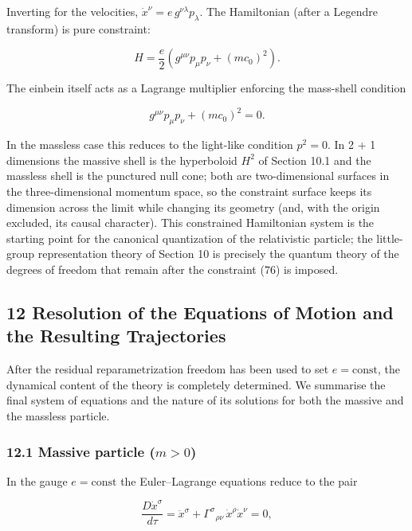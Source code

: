 \documentclass[
]{article}
\begin{document}
Inverting for the velocities,
\(\dot{x}^{\nu} = e\, g^{\nu\lambda} p_{\lambda}\). The Hamiltonian
(after a Legendre transform) is pure constraint:

\[H = \frac{e}{2} \left( g^{\mu\nu} p_{\mu} p_{\nu} + (mc_{0})^{2} \right). \tag{75}\]

The einbein itself acts as a Lagrange multiplier enforcing the
mass-shell condition

\[g^{\mu\nu} p_{\mu} p_{\nu} + (mc_{0})^{2} = 0. \tag{76}\]

In the massless case this reduces to the light-like condition
\(p^{2} = 0\). In 2 + 1 dimensions the massive shell is the hyperboloid
\(H^{2}\) of Section 10.1 and the massless shell is the punctured null
cone; both are two-dimensional surfaces in the three-dimensional
momentum space, so the constraint surface keeps its dimension across the
limit while changing its geometry (and, with the origin excluded, its
causal character). This constrained Hamiltonian system is the starting
point for the canonical quantization of the relativistic particle; the
little-group representation theory of Section 10 is precisely the
quantum theory of the degrees of freedom that remain after the
constraint (76) is imposed.

\hypertarget{resolution-of-the-equations-of-motion-and-the-resulting-trajectories}{%
\subsection{12 Resolution of the Equations of Motion and the Resulting
Trajectories}\label{resolution-of-the-equations-of-motion-and-the-resulting-trajectories}}

After the residual reparametrization freedom has been used to set
\(e = \mathrm{const}\), the dynamical content of the theory is
completely determined. We summarise the final system of equations and
the nature of its solutions for both the massive and the massless
particle.

\hypertarget{massive-particle-m-0}{%
\subsubsection{\texorpdfstring{12.1 Massive particle
(\(m > 0\))}{12.1 Massive particle (m \textgreater{} 0)}}\label{massive-particle-m-0}}

In the gauge \(e = \mathrm{const}\) the Euler--Lagrange equations reduce
to the pair

\[\frac{D \dot{x}^{\sigma}}{d\tau} = \ddot{x}^{\sigma} + \Gamma^{\sigma}{}_{\rho\nu}\, \dot{x}^{\rho} \dot{x}^{\nu} = 0, \tag{77}\]
\end{document}
